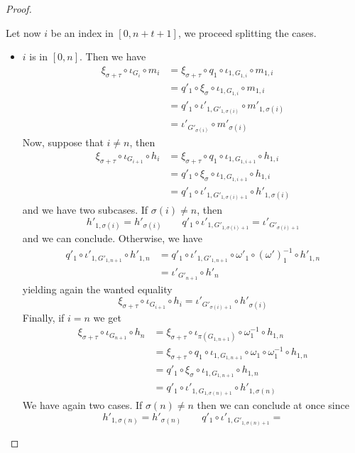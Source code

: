 \begin{proof}
\begin{itemize}
Let now $i$ be an index in $[0, n+t+1]$, we proceed splitting the cases.
\begin{itemize}
	\item $i$ is in $[0,n]$. Then we have
	\begin{align*}
		\xi_{\sigma+\tau}\circ \iota_{G_i} \circ m_i &= \xi_{\sigma+\tau} \circ q_1\circ \iota_{1, G_{1,i}}\circ m_{1,i}\\&=q'_1 \circ \xi_\sigma \circ \iota_{1, G_{1,i}}\circ m_{1,i}\\&= q'_1\circ \iota'_{1, G'_{1,\sigma(i)}}\circ m'_{1,\sigma(i)}\\&=\iota'_{G'_{\sigma(i)}}\circ m'_{\sigma(i)}
	\end{align*}
	Now, suppose that $i\neq n$, then 
	\begin{align*}
		\xi_{\sigma+\tau}\circ \iota_{G_{i+1}} \circ h_i &= \xi_{\sigma+\tau} \circ q_1\circ \iota_{1, G_{1,{i+1}}}\circ h_{1,i}\\&=q'_1\circ \xi_\sigma \circ \iota_{1, G_{1,{i+1}}}\circ h_{1,i}\\&= q'_1\circ \iota'_{1, G'_{1,\sigma(i)+1}}\circ h'_{1,\sigma(i)}
	\end{align*}
	and we have two subcases. If $\sigma(i)\neq n$, then \[h'_{1, \sigma(i)}=h'_{\sigma(i)} \qquad q'_1\circ \iota'_{1, G'_{1,\sigma(i)+1}}=
	\iota'_{G'_{\sigma(i)+1}}\] 
	and we can conclude. Otherwise, we have
	\begin{align*}q'_1\circ \iota'_{1, G'_{1,n+1}}\circ h'_{1,n}&=q'_1 \circ \iota'_{1,G'_{1,n+1}} \circ \omega'_1\circ (\omega')^{-1}_1 \circ h'_{1,n}\\&=\iota'_{G'_{n+1}}\circ h'_n
	\end{align*}
	yielding again the wanted equality
	\[\xi_{\sigma+\tau}\circ \iota_{G_{i+1}} \circ h_i=\iota'_{G'_{\sigma(i)+1}}\circ h'_{\sigma(i)}\]
	Finally, if $i=n$ we get
	\begin{align*}
		\xi_{\sigma+\tau}\circ \iota_{G_{n+1}} \circ h_n &= \xi_{\sigma+\tau} \circ \iota_{\pi(G_{1,n+1})} \circ \omega^{-1}_1\circ h_{1,n}\\&= \xi_{\sigma+\tau} \circ q_1\circ \iota_{1, G_{1,n+1}} \circ \omega_1 \circ \omega^{-1}_1 \circ h_{1,n}\\&=q'_1 \circ \xi_\sigma \circ \iota_{1, G_{1,n+1}} \circ h_{1,n}\\&=q'_1\circ \iota'_{1, G_{1,\sigma(n)+1}} \circ h'_{1,\sigma(n)}
	\end{align*}
	We have again two cases. If $\sigma(n)\neq n$ then we can conclude at once since 
	\[h'_{1, \sigma(n)}=h'_{\sigma(n)} \qquad q'_1\circ \iota'_{1, G'_{1,\sigma(n)+1}}=
\]
\end{itemize}
\end{itemize}
\end{proof}
